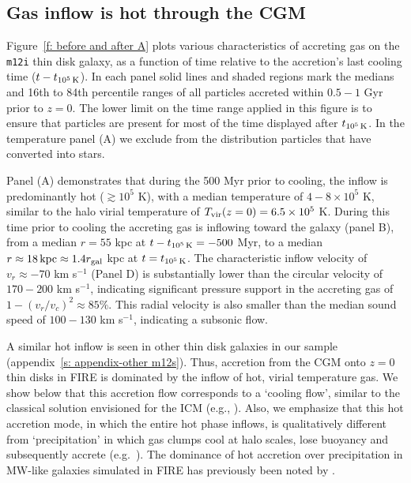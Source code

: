 \documentclass[fleqn,usenatbib]{mnras}
\newcommand{\tcon}{t_{10^5\,{\rm K}}}
\newcommand{\Tvir}{T_{\rm vir}}
\begin{document}
\subsection{Gas inflow is hot through the CGM}
\label{s: characteristics -- inflowing gas phase}

Figure~\ref{f: before and after A} plots various characteristics of accreting gas on the \texttt{m12i} thin disk galaxy, as a function of time relative to the accretion's last cooling time ($t - \tcon$).
In each panel solid lines and shaded regions mark the medians and 16th to 84th percentile ranges of all particles accreted within $0.5-1$ Gyr prior to $z=0$.
The lower limit on the time range applied in this figure is to ensure that particles are present for most of the time displayed after $\tcon$.
In the temperature panel (A) we exclude from the distribution particles that have converted into stars. 

Panel (A) demonstrates that during the 500 Myr prior to cooling, the inflow is predominantly hot ($\gtrsim 10^5$ K), with a median temperature of $4-8\times10^5$ K, similar to the halo virial temperature of $\Tvir(z=0)=6.5\times10^5$ K.
During this time prior to cooling the accreting gas is inflowing toward the galaxy (panel B), from a median $r=55$ kpc at $t-\tcon=-500$ Myr, to a median $r\approx18\,{\rm kpc}\approx1.4 r_{\rm gal}$ kpc at $t=\tcon$.
The characteristic inflow velocity of $v_r \approx-70$ km s$^{-1}$ (Panel D) is substantially lower than the circular velocity of $170-200$ km s$^{-1}$, indicating significant pressure support in the accreting gas of $1-(v_r/v_c)^2\approx85\%$. This radial velocity is also smaller than the median sound speed of $100-130$ km s$^{-1}$, indicating a subsonic flow. 


A similar hot inflow is seen in other thin disk galaxies in our sample (appendix~\ref{s: appendix-other m12s}).
Thus, accretion from the CGM onto $z=0$ thin disks in FIRE is dominated by the inflow of hot, virial temperature gas.
We show below that this accretion flow corresponds to a `cooling flow', similar to the classical solution envisioned for the ICM (e.g., \citealt{Mathews1978}).
Also, we emphasize that this hot accretion mode, in which the entire hot phase inflows, is qualitatively different from `precipitation' in which gas clumps cool at halo scales, lose buoyancy and subsequently accrete (e.g.~\citealt{Maller2004,Voit2017}). The dominance of hot accretion over precipitation in MW-like galaxies simulated in FIRE has previously been noted by \cite{Esmerian2021}. 
\end{document}
